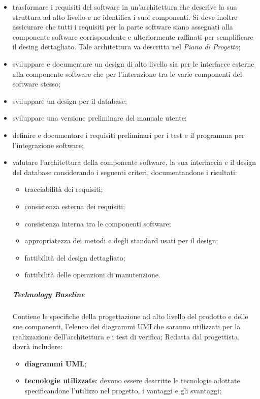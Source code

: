 			\begin{itemize}
			\item trasformare i requisiti del software in un'architettura che descrive la sua struttura ad alto livello e ne identifica i suoi componenti. Si deve inoltre assicurare che tutti i requisiti per la parte software siano assegnati alla componente software corrispondente e ulteriormente raffinati per semplificare il desing dettagliato. Tale architettura va descritta nel \textit{Piano di Progetto};
			\item sviluppare e documentare un design di alto livello sia per le interfacce esterne alla componente software che per l'interazione tra le varie componenti del software stesso;
			\item sviluppare un design per il database;
			\item sviluppare una versione preliminare del manuale utente;
			\item definire e documentare i requisiti preliminari per i test e il programma per l'integrazione software;
			\item valutare l'architettura della componente software, la sua interfaccia e il design del database considerando i seguenti criteri, documentandone i risultati:
			\begin{itemize}
			\item tracciabilità dei requisiti;
			\item consistenza esterna dei requisiti;
			\item consistenza interna tra le componenti software;
			\item appropriatezza dei metodi e degli standard usati per il design;
			\item fattibilità del design dettagliato;
			\item fattibilità delle operazioni di manutenzione.
			\end{itemize}
			\subparagraph{Technology Baseline} Contiene le specifiche della progettazione ad alto livello del prodotto e delle sue componenti, l'elenco dei diagrammi UML\glosp che saranno utilizzati per la realizzazione dell'architettura e i test di verifica;\newline \newline
			Redatta dal progettista, dovrà includere:
			\begin{itemize}
				\item \textbf{diagrammi UML\glo};
				\item \textbf{tecnologie utilizzate}: devono essere descritte le tecnologie adottate specificandone l'utilizzo nel progetto, i vantaggi e gli svantaggi;

\end{itemize}
\end{itemize}
